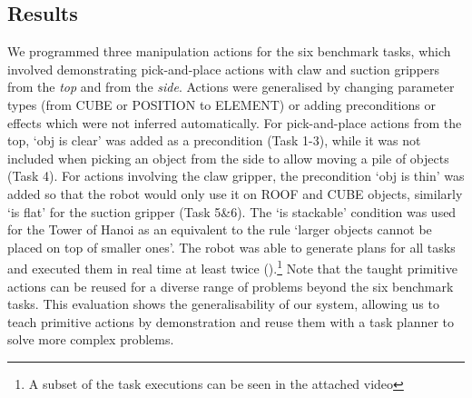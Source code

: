 \subsection{Results}
We programmed three manipulation actions for the six benchmark tasks, which involved demonstrating pick-and-place actions with claw and suction grippers from the \textit{top} and from the \textit{side}.
Actions were generalised by changing parameter types (\eg from CUBE or POSITION to ELEMENT) or adding preconditions or effects which were not inferred automatically.
For pick-and-place actions from the top, `obj is clear' was added as a precondition (Task 1-3), while it was not included when picking an object from the side to allow moving a pile of objects (Task 4).
For actions involving the claw gripper, the precondition `obj is thin' was added so that the robot would only use it on ROOF and CUBE objects, similarly `is flat' for the suction gripper (Task 5\&6).
The `is stackable' condition was used for the Tower of Hanoi as an equivalent to the rule `larger objects cannot be placed on top of smaller ones'.
The robot was able to generate plans for all tasks and executed them in real time at least twice ().\footnote{A subset of the task executions can be seen in the attached video}
Note that the taught primitive actions can be reused for a diverse range of problems beyond the six benchmark tasks.
This evaluation shows the generalisability of our system, allowing us to teach primitive actions by demonstration and reuse them with a task planner to solve more complex problems.
